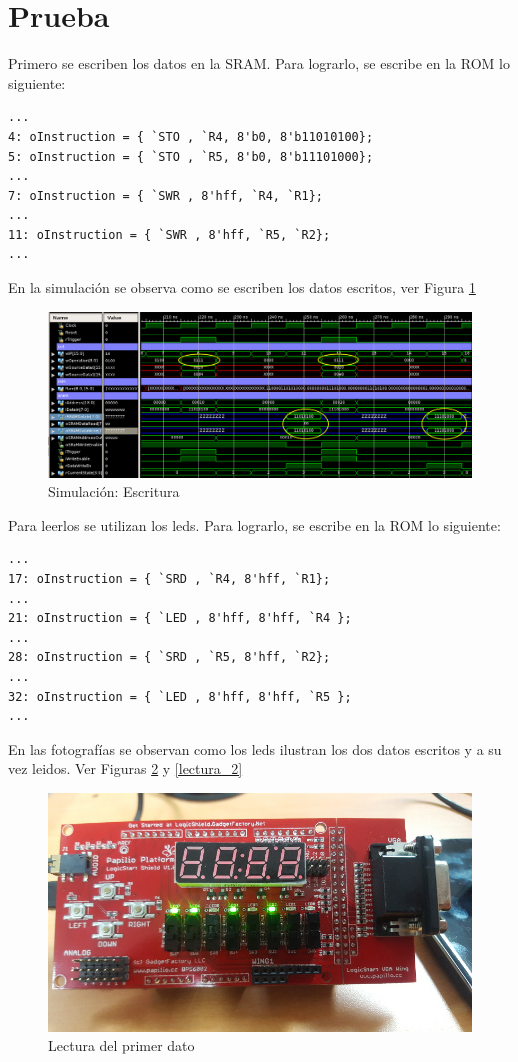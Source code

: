 \documentclass[10pt]{article}
\begin{document}
\section{Prueba}
Primero se escriben los datos en la SRAM. Para lograrlo, se escribe en la ROM lo siguiente:

\begin{lstlisting}
...
4: oInstruction = { `STO , `R4, 8'b0, 8'b11010100};
5: oInstruction = { `STO , `R5, 8'b0, 8'b11101000};
...
7: oInstruction = { `SWR , 8'hff, `R4, `R1};
...
11: oInstruction = { `SWR , 8'hff, `R5, `R2};
...
\end{lstlisting}

En la simulación se observa como se escriben los datos escritos, ver Figura \ref{sim_escritura}

\begin{figure}[hbtp]
\centering
\includegraphics[width=1\textwidth]{escritura.png}
\caption{Simulación: Escritura}
\label{sim_escritura}
\end{figure}

Para leerlos se utilizan los leds. Para lograrlo, se escribe en la ROM lo siguiente:

\begin{lstlisting}
...
17: oInstruction = { `SRD , `R4, 8'hff, `R1};
...
21: oInstruction = { `LED , 8'hff, 8'hff, `R4 };
...
28: oInstruction = { `SRD , `R5, 8'hff, `R2};
...
32: oInstruction = { `LED , 8'hff, 8'hff, `R5 };
...
\end{lstlisting}

En las fotografías se observan como los leds ilustran los dos datos escritos y a su vez leidos. Ver Figuras \ref{lectura_1} y \ref{lectura_2}

\begin{figure}[hbtp]
\centering
\includegraphics[width=1\textwidth]{lecturaa.jpg}
\caption{Lectura del primer dato}
\label{lectura_1}
\end{figure}
\end{document}
